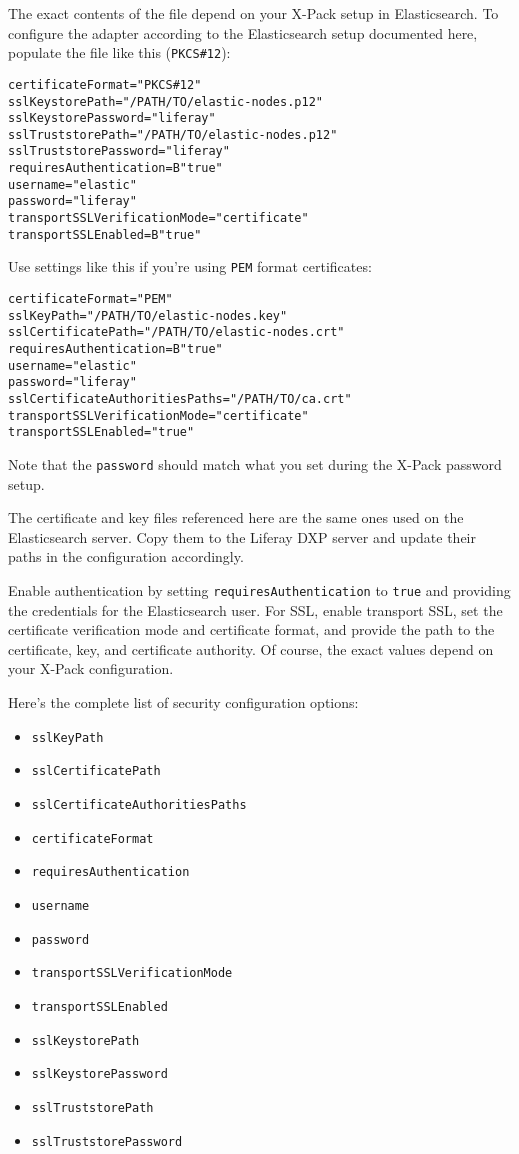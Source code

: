 The exact contents of the file depend on your X-Pack setup in
Elasticsearch. To configure the adapter according to the Elasticsearch
setup documented here, populate the file like this (\texttt{PKCS\#12}):

\begin{verbatim}
certificateFormat="PKCS#12"
sslKeystorePath="/PATH/TO/elastic-nodes.p12"
sslKeystorePassword="liferay"
sslTruststorePath="/PATH/TO/elastic-nodes.p12"
sslTruststorePassword="liferay"
requiresAuthentication=B"true"
username="elastic"
password="liferay"
transportSSLVerificationMode="certificate"
transportSSLEnabled=B"true"
\end{verbatim}

Use settings like this if you're using \texttt{PEM} format certificates:

\begin{verbatim}
certificateFormat="PEM"
sslKeyPath="/PATH/TO/elastic-nodes.key"
sslCertificatePath="/PATH/TO/elastic-nodes.crt"
requiresAuthentication=B"true"
username="elastic"
password="liferay"
sslCertificateAuthoritiesPaths="/PATH/TO/ca.crt"
transportSSLVerificationMode="certificate"
transportSSLEnabled="true"
\end{verbatim}

Note that the \texttt{password} should match what you set during the
X-Pack password setup.

The certificate and key files referenced here are the same ones used on
the Elasticsearch server. Copy them to the Liferay DXP server and update
their paths in the configuration accordingly.

Enable authentication by setting \texttt{requiresAuthentication} to
\texttt{true} and providing the credentials for the Elasticsearch user.
For SSL, enable transport SSL, set the certificate verification mode and
certificate format, and provide the path to the certificate, key, and
certificate authority. Of course, the exact values depend on your X-Pack
configuration.

Here's the complete list of security configuration options:

\begin{itemize}
\tightlist
\item
  \texttt{sslKeyPath}
\item
  \texttt{sslCertificatePath}
\item
  \texttt{sslCertificateAuthoritiesPaths}
\item
  \texttt{certificateFormat}
\item
  \texttt{requiresAuthentication}
\item
  \texttt{username}
\item
  \texttt{password}
\item
  \texttt{transportSSLVerificationMode}
\item
  \texttt{transportSSLEnabled}
\item
  \texttt{sslKeystorePath}
\item
  \texttt{sslKeystorePassword}
\item
  \texttt{sslTruststorePath}
\item
  \texttt{sslTruststorePassword}
\end{itemize}

